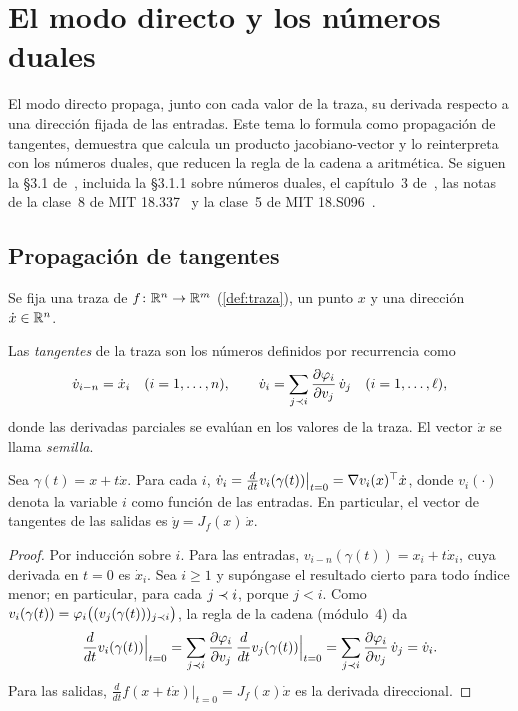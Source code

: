\chapter{El modo directo y los números duales}
\label{tema:2}

El modo directo propaga, junto con cada valor de la traza, su derivada respecto a una dirección fijada de las entradas. Este tema lo formula como propagación de tangentes, demuestra que calcula un producto jacobiano-vector y lo reinterpreta con los números duales, que reducen la regla de la cadena a aritmética. Se siguen la §3.1 de~\cite{baydin}, incluida la §3.1.1 sobre números duales, el capítulo~3 de~\cite{gw}, las notas de la clase~8 de MIT 18.337~\cite{mit18337} y la clase~5 de MIT 18.S096~\cite{mit18s096}.

\section{Propagación de tangentes}

Se fija una traza de $f\colon\mathbb{R}^{n}\to\mathbb{R}^{m}$ (\cref{def:traza}), un punto $x$ y una dirección $\dot x\in\mathbb{R}^{n}$.

\begin{definicion}[Tangentes]\label{def:tangente}
Las \emph{tangentes} de la traza son los números definidos por recurrencia como
\[
\dot v_{i-n}=\dot x_i\quad(i=1,\dots,n),\qquad
\dot v_i=\sum_{j\prec i}\frac{\partial\varphi_i}{\partial v_j}\,\dot v_j\quad(i=1,\dots,\ell),
\]
donde las derivadas parciales se evalúan en los valores de la traza. El vector $\dot x$ se llama \emph{semilla}.
\end{definicion}

\begin{teorema}\label{teo:directo}
Sea $\gamma(t)=x+t\dot x$. Para cada $i$, $\dot v_i=\frac{d}{dt}v_i(\gamma(t))\big|_{t=0}=\nabla v_i(x)^{\top}\dot x$, donde $v_i(\cdot)$ denota la variable $i$ como función de las entradas. En particular, el vector de tangentes de las salidas es $\dot y=J_f(x)\,\dot x$.
\end{teorema}

\begin{proof}
Por inducción sobre $i$. Para las entradas, $v_{i-n}(\gamma(t))=x_i+t\dot x_i$, cuya derivada en $t=0$ es $\dot x_i$. Sea $i\ge 1$ y supóngase el resultado cierto para todo índice menor; en particular, para cada $j\prec i$, porque $j<i$. Como $v_i(\gamma(t))=\varphi_i\bigl((v_j(\gamma(t)))_{j\prec i}\bigr)$, la regla de la cadena (módulo~4) da
\[
\frac{d}{dt}v_i(\gamma(t))\Big|_{t=0}=\sum_{j\prec i}\frac{\partial\varphi_i}{\partial v_j}\,\frac{d}{dt}v_j(\gamma(t))\Big|_{t=0}=\sum_{j\prec i}\frac{\partial\varphi_i}{\partial v_j}\,\dot v_j=\dot v_i.
\]
Para las salidas, $\frac{d}{dt}f(x+t\dot x)|_{t=0}=J_f(x)\dot x$ es la derivada direccional.
\end{proof}

